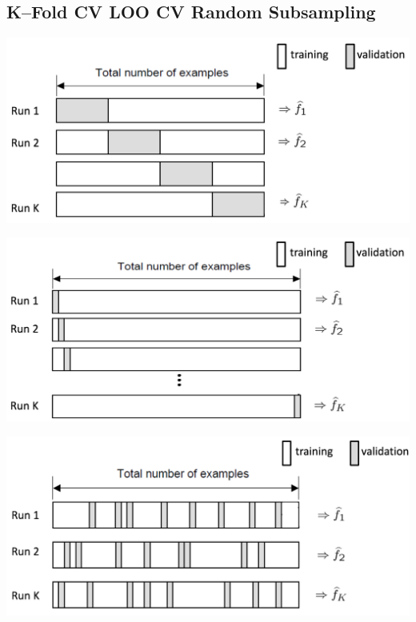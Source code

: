 \documentclass[18pt,a3paper,landscape, ncols=3]{cheatsheet}
\begin{document}
		\subsection{K--Fold CV \qquad\qquad\qquad\quad LOO CV \qquad\qquad\qquad Random Subsampling}
			\begin{mdframed}
				\begin{minipage}{.33\textwidth}
					\includegraphics{K_fold_cross_validation.png}
				\end{minipage}%
				\begin{minipage}{.33\textwidth}
					\includegraphics{LOO_cross_validation.png}
				\end{minipage}%
				\begin{minipage}{.33\textwidth}
					\includegraphics{random_subsampling.png}
				\end{minipage}
			\end{mdframed}
\end{document}
